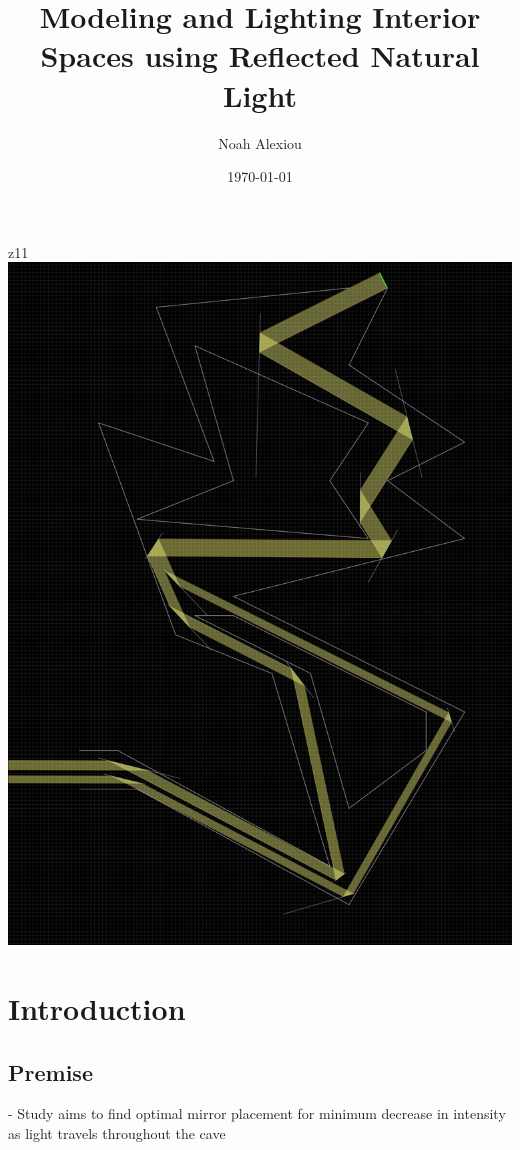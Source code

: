 \documentclass[11pt, letterpaper]{article}
\begin{document}
\begin{titlepage}
	\title{Modeling and Lighting Interior Spaces using Reflected Natural Light}
	\author{Noah Alexiou}
	\date{\today}
	
	\maketitle
	\centering
 z11	\includegraphics[width=15cm]{Cave.png}
	
\end{titlepage}

\newpage
\tableofcontents


\newpage

\section{Introduction}


\subsection{Premise}
- Study aims to find optimal mirror placement for minimum decrease in intensity as light travels throughout the cave
\end{document}
